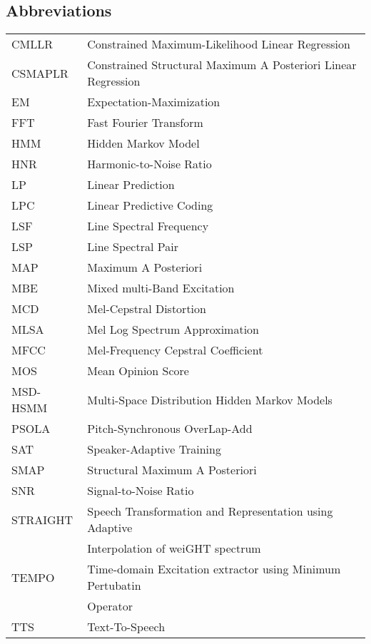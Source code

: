\documentclass[english,12pt,a4paper,pdftex]{article}
\begin{document}
\subsection*{Abbreviations}
\begin{tabular}{l l}
	CMLLR		& Constrained Maximum-Likelihood Linear Regression\\
	CSMAPLR		& Constrained Structural Maximum A Posteriori Linear Regression\\
	EM 			& Expectation-Maximization\\
	FFT 		& Fast Fourier Transform\\
	HMM			& Hidden Markov Model\\
	HNR			& Harmonic-to-Noise Ratio\\
	LP			& Linear Prediction\\
	LPC 		& Linear Predictive Coding\\
	LSF			& Line Spectral Frequency\\
	LSP			& Line Spectral Pair\\
	MAP			& Maximum A Posteriori\\
	MBE			& Mixed multi-Band Excitation\\
	MCD 		& Mel-Cepstral Distortion\\
	MLSA		& Mel Log Spectrum Approximation\\
	MFCC		& Mel-Frequency Cepstral Coefficient\\
	MOS			& Mean Opinion Score\\
	MSD-HSMM	& Multi-Space Distribution Hidden Markov Models\\
	PSOLA		& Pitch-Synchronous OverLap-Add\\
	SAT			& Speaker-Adaptive Training\\
	SMAP 		& Structural Maximum A Posteriori\\
	SNR 		& Signal-to-Noise Ratio\\
	STRAIGHT	& Speech Transformation and Representation using Adaptive \\
				& Interpolation of weiGHT spectrum\\
	TEMPO		& Time-domain Excitation extractor using Minimum Pertubatin\\
				& Operator\\
	TTS			& Text-To-Speech
\end{tabular}
\cleardoublepage
\storeinipagenumber
{}
\setcounter{page}{1}










\end{document}
